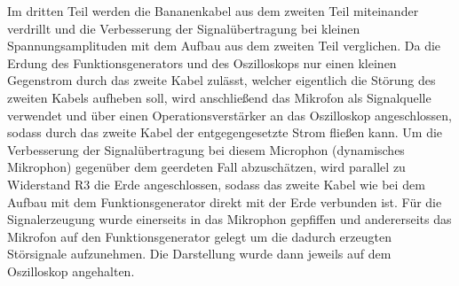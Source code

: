 \documentclass[12pt,a4paper]{article}
\begin{document}
Im dritten Teil werden die Bananenkabel aus dem zweiten Teil miteinander verdrillt und die Verbesserung der Signalübertragung bei kleinen Spannungsamplituden mit dem Aufbau aus dem zweiten Teil verglichen.\newline
Da die Erdung des Funktionsgenerators und des Oszilloskops nur einen kleinen Gegenstrom durch das zweite Kabel zulässt, welcher eigentlich die Störung des zweiten Kabels aufheben soll, wird anschließend das Mikrofon als Signalquelle verwendet und über einen Operationsverstärker an das Oszilloskop angeschlossen, sodass durch das zweite Kabel der entgegengesetzte Strom fließen kann. Um die Verbesserung der Signalübertragung bei diesem Microphon (dynamisches Mikrophon) gegenüber dem geerdeten Fall abzuschätzen, wird parallel zu Widerstand R3 die Erde angeschlossen, sodass das zweite Kabel wie bei dem Aufbau mit dem Funktionsgenerator direkt mit der Erde verbunden ist. Für die Signalerzeugung wurde einerseits in das Mikrophon gepfiffen und andererseits das Mikrofon auf den Funktionsgenerator gelegt um die dadurch erzeugten Störsignale aufzunehmen. Die Darstellung wurde dann jeweils auf dem Oszilloskop angehalten.


\end{document}
